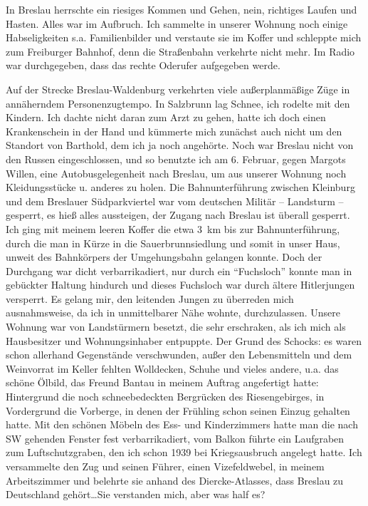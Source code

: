 \documentclass[a5paper,pagesize,10pt,twoside=true]{scrbook}
\renewcommand{\marginpar}[2][]{}
\begin{document}
In Breslau herrschte ein riesiges Kommen und Gehen, nein, richtiges Laufen und Hasten. Alles war im Aufbruch. Ich sammelte in unserer Wohnung noch einige Habseligkeiten s.a. Familienbilder und verstaute sie im Koffer und schleppte mich zum Freiburger Bahnhof, denn die Straßenbahn verkehrte nicht mehr. Im Radio war durchgegeben, dass das rechte Oderufer aufgegeben werde.

Auf der Strecke Breslau-Waldenburg verkehrten viele außerplanmäßige Züge in annäherndem Personenzugtempo. In Salzbrunn lag Schnee, ich rodelte mit den Kindern. Ich dachte nicht daran zum Arzt zu gehen, hatte ich doch einen Krankenschein in der Hand und kümmerte mich zunächst auch nicht um den Standort von Barthold, dem ich ja noch angehörte. Noch war Breslau nicht von den Russen eingeschlossen, und so benutzte ich am 6. Februar, gegen Margots Willen, eine Autobusgelegenheit nach Breslau, \marginpar{56} um aus unserer Wohnung noch Kleidungsstücke u. anderes zu holen. Die Bahnunterführung zwischen Kleinburg und dem Breslauer Südparkviertel war vom deutschen Militär -- Landsturm -- gesperrt, es hieß alles aussteigen, der Zugang nach Breslau ist überall gesperrt. Ich ging mit meinem leeren Koffer die etwa 3~km bis zur Bahnunterführung, durch die man in Kürze in die Sauerbrunnsiedlung und somit in unser Haus, unweit des Bahnkörpers der Umgehungsbahn gelangen konnte. Doch der Durchgang war dicht verbarrikadiert, nur durch ein \enquote{Fuchsloch} konnte man in gebückter Haltung hindurch und dieses Fuchsloch war durch ältere Hitlerjungen versperrt. Es gelang mir, den leitenden Jungen zu überreden mich ausnahmsweise, da ich in unmittelbarer Nähe wohnte, durchzulassen. Unsere Wohnung war von Landstürmern besetzt, die sehr erschraken, als ich mich als Hausbesitzer und Wohnungsinhaber entpuppte. Der Grund des Schocks: es waren schon allerhand Gegenstände verschwunden, außer den Lebensmitteln und dem Weinvorrat im Keller fehlten Wolldecken, Schuhe und vieles andere, u.a. das schöne Ölbild, das Freund Bantau in meinem Auftrag angefertigt hatte: Hintergrund die noch schneebedeckten Bergrücken des Riesengebirges, in Vordergrund die Vorberge, in denen der Frühling schon seinen \marginpar{57} Einzug gehalten hatte. Mit den schönen Möbeln des Ess- und Kinderzimmers hatte man die nach SW gehenden Fenster fest verbarrikadiert, vom Balkon führte ein Laufgraben zum Luftschutzgraben, den ich schon 1939 bei Kriegsausbruch angelegt hatte. Ich versammelte den Zug und seinen Führer, einen Vizefeldwebel, in meinem Arbeitszimmer und belehrte sie anhand des Diercke-Atlasses, dass Breslau zu Deutschland gehört\dots Sie verstanden mich, aber was half es?
\end{document}
